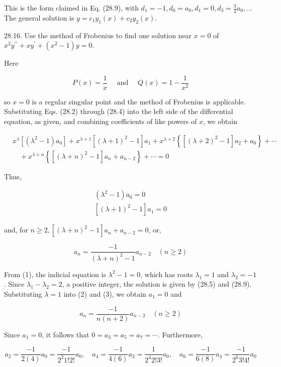 \documentclass[10pt]{article}
\begin{document}
This is the form claimed in Eq. (28.9), with $d_{1}=-1, d_{0}=a_{0}, d_{1}=0, d_{3}=\frac{3}{4} a_{0}, \ldots$ The general solution is $y=c_{1} y_{1}(x)+c_{2} y_{2}(x)$.

28.16. Use the method of Frobenius to find one solution near $x=0$ of $x^{2} y^{\prime \prime}+x y^{\prime}+\left(x^{2}-1\right) y=0$.

Here

$$
P(x)=\frac{1}{x} \quad \text { and } \quad Q(x)=1-\frac{1}{x^{2}}
$$

so $x=0$ is a regular singular point and the method of Frobenius is applicable. Substituting Eqs. (28.2) through (28.4) into the left side of the differential equation, as given, and combining coefficients of like powers of $x$, we obtain

$$
\begin{aligned}
& x^{\lambda}\left[\left(\lambda^{2}-1\right) a_{0}\right]+x^{\lambda+1}\left[(\lambda+1)^{2}-1\right] a_{1}+x^{\lambda+2}\left\{\left[(\lambda+2)^{2}-1\right] a_{2}+a_{0}\right\}+\cdots \\
& \quad+x^{\lambda+n}\left\{\left[(\lambda+n)^{2}-1\right] a_{n}+a_{n-2}\right\}+\cdots=0
\end{aligned}
$$

Thus,


\begin{gather*}
\left(\lambda^{2}-1\right) a_{0}=0  \tag{1}\\
{\left[(\lambda+1)^{2}-1\right] a_{1}=0} \tag{2}
\end{gather*}


and, for $n \geq 2,\left[(\lambda+n)^{2}-1\right] a_{n}+a_{n-2}=0$, or,


\begin{equation*}
a_{n}=\frac{-1}{(\lambda+n)^{2}-1} a_{n-2} \quad(n \geq 2) \tag{3}
\end{equation*}


From (1), the indicial equation is $\lambda^{2}-1=0$, which has roots $\lambda_{1}=1$ and $\lambda_{2}=-1$. Since $\lambda_{1}-\lambda_{2}=2$, a positive integer, the solution is given by (28.5) and (28.9). Substituting $\lambda=1$ into (2) and (3), we obtain $a_{1}=0$ and

$$
a_{n}=\frac{-1}{n(n+2)} a_{n-2} \quad(n \geq 2)
$$

Since $a_{1}=0$, it follows that $0=a_{3}=a_{5}=a_{7}=\cdots$. Furthermore,

$$
a_{2}=\frac{-1}{2(4)} a_{0}=\frac{-1}{2^{2} 1 ! 2 !} a_{0}, \quad a_{4}=\frac{-1}{4(6)} a_{2}=\frac{1}{2^{4} 2 ! 3 !} a_{0}, \quad a_{6}=\frac{-1}{6(8)} a_{4}=\frac{-1}{2^{6} 3 ! 4 !} a_{0}
$$
\end{document}
